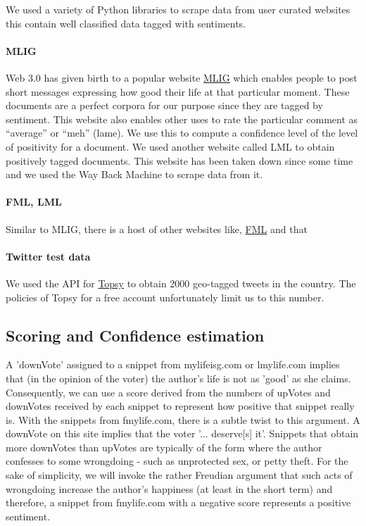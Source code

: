 \documentclass[11pt, letterpaper, conference, final, twocolumn]{ieeeconf}
\begin{document}
We used a variety of Python libraries to scrape data from user curated websites
this contain well classified data tagged with sentiments.  \paragraph{MLIG} Web
3.0 has given birth to a popular website \href{http://mylifeisg.com}{MLIG}
which enables people to post short messages expressing how good their life at
that particular moment. These documents are a perfect corpora for our purpose
since they are tagged by sentiment. This website also enables other uses to
rate the particular comment as ``average'' or ``meh'' (lame). We use this to
compute a confidence level of the level of positivity for a document. We used
another website called LML to obtain positively tagged documents. This website
has been taken down since some time and we used the Way Back Machine to scrape
data from it. \paragraph{FML, LML} Similar to MLIG, there is a host of other
websites like, \href{fmylife.com}{FML} and  that \paragraph{Twitter test data}
We used the API for \href{topsy.com}{Topsy} to obtain 2000 geo-tagged tweets in
the country. The policies of Topsy for a free account unfortunately limit us to
this number.

\subsection{Scoring and Confidence estimation}
\label{ssec:scoring}

A 'downVote' assigned to a snippet from mylifeisg.com or lmylife.com implies
that (in the opinion of the voter) the author's life is not as 'good' as she
claims. Consequently, we can use a score derived from the numbers of upVotes
and downVotes received by each snippet to represent how positive that snippet
really is. With the snippets from fmylife.com, there is a subtle twist to this
argument. A downVote on this site implies that the voter '... deserve[s] it'.
Snippets that obtain more downVotes than upVotes are typically of the form
where the author confesses to some wrongdoing - such as unprotected sex, or
petty theft. For the sake of simplicity, we will invoke the rather Freudian
argument that such acts of wrongdoing increase the author's happiness (at least
in the short term) and therefore, a snippet from fmylife.com with a negative
score represents a positive sentiment.
\end{document}
